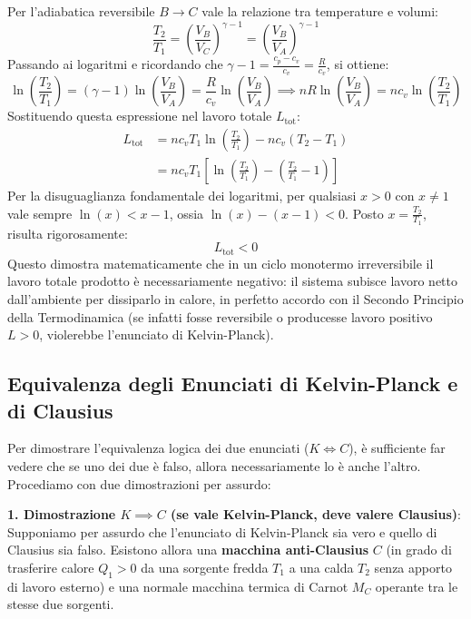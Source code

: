 Per l'adiabatica reversibile $B \to C$ vale la relazione tra temperature e volumi:
\begin{equation}
    \frac{T_2}{T_1} = \left(\frac{V_B}{V_C}\right)^{\gamma-1} = \left(\frac{V_B}{V_A}\right)^{\gamma-1}
\end{equation}
Passando ai logaritmi e ricordando che $\gamma - 1 = \frac{c_p - c_v}{c_v} = \frac{R}{c_v}$, si ottiene:
\begin{equation}
    \ln\left(\frac{T_2}{T_1}\right) = (\gamma - 1) \ln\left(\frac{V_B}{V_A}\right) = \frac{R}{c_v} \ln\left(\frac{V_B}{V_A}\right) \implies n R \ln\left(\frac{V_B}{V_A}\right) = n c_v \ln\left(\frac{T_2}{T_1}\right)
\end{equation}
Sostituendo questa espressione nel lavoro totale $L_{\text{tot}}$:
\begin{align}
    L_{\text{tot}} &= n c_v T_1 \ln\left(\frac{T_2}{T_1}\right) - n c_v (T_2 - T_1) \nonumber \\
    &= n c_v T_1 \left[ \ln\left(\frac{T_2}{T_1}\right) - \left(\frac{T_2}{T_1} - 1\right) \right]
\end{align}
Per la disuguaglianza fondamentale dei logaritmi, per qualsiasi $x > 0$ con $x \neq 1$ vale sempre $\ln(x) < x - 1$, ossia $\ln(x) - (x-1) < 0$. Posto $x = \frac{T_2}{T_1}$, risulta rigorosamente:
\begin{equation}
    \boxed{L_{\text{tot}} < 0}
\end{equation}
Questo dimostra matematicamente che in un ciclo monotermo irreversibile il lavoro totale prodotto è necessariamente negativo: il sistema subisce lavoro netto dall'ambiente per dissiparlo in calore, in perfetto accordo con il Secondo Principio della Termodinamica (se infatti fosse reversibile o producesse lavoro positivo $L > 0$, violerebbe l'enunciato di Kelvin-Planck).




\subsection{Equivalenza degli Enunciati di Kelvin-Planck e di Clausius}
Per dimostrare l'equivalenza logica dei due enunciati ($K \iff C$), è sufficiente far vedere che se uno dei due è falso, allora necessariamente lo è anche l'altro. Procediamo con due dimostrazioni per assurdo:

\noindent \textbf{1. Dimostrazione $K \implies C$ (se vale Kelvin-Planck, deve valere Clausius)}: \\
Supponiamo per assurdo che l'enunciato di Kelvin-Planck sia vero e quello di Clausius sia falso.
Esistono allora una \textbf{macchina anti-Clausius} $C$ (in grado di trasferire calore $Q_1 > 0$ da una sorgente fredda $T_1$ a una calda $T_2$ senza apporto di lavoro esterno) e una normale macchina termica di Carnot $M_C$ operante tra le stesse due sorgenti.

